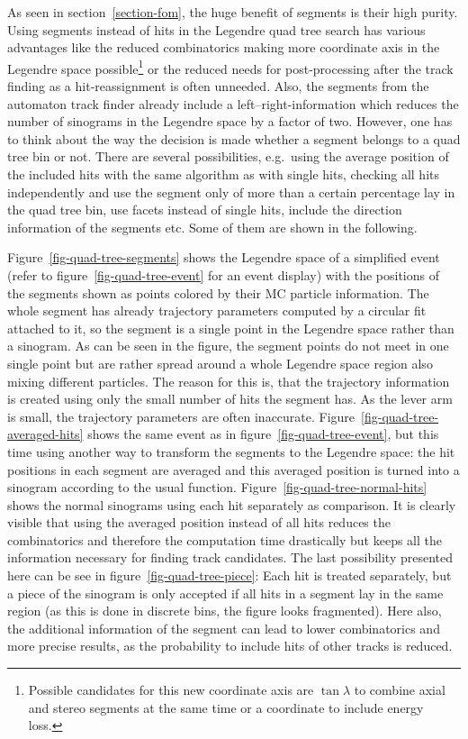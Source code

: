 As seen in section~\ref{section-fom}, the huge benefit of segments is their high purity. Using segments instead of hits in the Legendre quad tree search has various advantages like the reduced combinatorics making more coordinate axis in the Legendre space possible\footnote{Possible candidates for this new coordinate axis are $\tan \lambda$ to combine axial and stereo segments at the same time or a coordinate to include energy loss.} or the reduced needs for post-processing after the track finding as a hit-reassignment is often unneeded. Also, the segments from the automaton track finder already include a left--right-information which reduces the number of sinograms in the Legendre space by a factor of two. However, one has to think about the way the decision is made whether a segment belongs to a quad tree bin or not. There are several possibilities, e.g.\ using the average position of the included hits with the same algorithm as with single hits, checking all hits independently and use the segment only of more than a certain percentage lay in the quad tree bin, use facets instead of single hits, include the direction information of the segments etc. Some of them are shown in the following.

Figure~\ref{fig-quad-tree-segments} shows the Legendre space of a simplified event (refer to figure~\ref{fig-quad-tree-event} for an event display) with the positions of the segments shown as points colored by their MC particle information. The whole segment has already trajectory parameters computed by a circular fit attached to it, so the segment is a single point in the Legendre space rather than a sinogram. As can be seen in the figure, the segment points do not meet in one single point but are rather spread around a whole Legendre space region also mixing different particles. The reason for this is, that the trajectory information is created using only the small number of hits the segment has. As the lever arm is small, the trajectory parameters are often inaccurate. 
Figure~\ref{fig-quad-tree-averaged-hits} shows the same event as in figure~\ref{fig-quad-tree-event}, but this time using another way to transform the segments to the Legendre space: the hit positions in each segment are averaged and this averaged position is turned into a sinogram according to the usual function. Figure~\ref{fig-quad-tree-normal-hits} shows the normal sinograms using each hit separately as comparison. It is clearly visible that using the averaged position instead of all hits reduces the combinatorics and therefore the computation time drastically but keeps all the information necessary for finding track candidates.
The last possibility presented here can be see in figure~\ref{fig-quad-tree-piece}: Each hit is treated separately, but a piece of the sinogram is only accepted if all hits in a segment lay in the same region (as this is done in discrete bins, the figure looks fragmented). Here also, the additional information of the segment can lead to lower combinatorics and more precise results, as the probability to include hits of other tracks is reduced.

